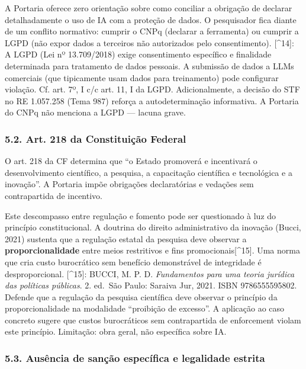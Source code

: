 \documentclass[
  12pt,
  a4paper,
  brazil
]{article}
\begin{document}
A Portaria oferece zero orientação sobre como conciliar a obrigação de
declarar detalhadamente o uso de IA com a proteção de dados. O
pesquisador fica diante de um conflito normativo: cumprir o CNPq
(declarar a ferramenta) ou cumprir a LGPD (não expor dados a terceiros
não autorizados pelo consentimento). {[}\^{}14{]}: A LGPD (Lei nº
13.709/2018) exige consentimento específico e finalidade determinada
para tratamento de dados pessoais. A submissão de dados a LLMs
comerciais (que tipicamente usam dados para treinamento) pode configurar
violação. Cf. art. 7º, I c/c art. 11, I da LGPD. Adicionalmente, a
decisão do STF no RE 1.057.258 (Tema 987) reforça a autodeterminação
informativa. A Portaria do CNPq não menciona a LGPD --- lacuna grave.

\subsubsection{5.2. Art. 218 da Constituição
Federal}\label{art.-218-da-constituiuxe7uxe3o-federal}

O art. 218 da CF determina que ``o Estado promoverá e incentivará o
desenvolvimento científico, a pesquisa, a capacitação científica e
tecnológica e a inovação''. A Portaria impõe obrigações declaratórias e
vedações sem contrapartida de incentivo.

Este descompasso entre regulação e fomento pode ser questionado à luz do
princípio constitucional. A doutrina do direito administrativo da
inovação (Bucci, 2021) sustenta que a regulação estatal da pesquisa deve
observar a \textbf{proporcionalidade} entre meios restritivos e fins
promocionais{[}\^{}15{]}. Uma norma que cria custo burocrático sem
benefício demonstrável de integridade é desproporcional. {[}\^{}15{]}:
BUCCI, M. P. D. \emph{Fundamentos para uma teoria jurídica das políticas
públicas}. 2. ed.~São Paulo: Saraiva Jur, 2021. ISBN 9786555595802.
Defende que a regulação da pesquisa científica deve observar o princípio
da proporcionalidade na modalidade ``proibição de excesso''. A aplicação
ao caso concreto sugere que custos burocráticos sem contrapartida de
enforcement violam este princípio. Limitação: obra geral, não específica
sobre IA.

\subsubsection{5.3. Ausência de sanção específica e legalidade
estrita}\label{ausuxeancia-de-sanuxe7uxe3o-especuxedfica-e-legalidade-estrita}
\end{document}
